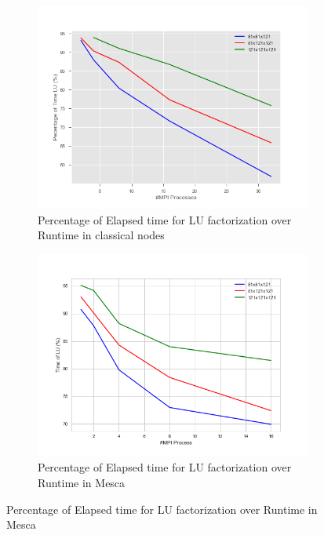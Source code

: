 \begin{figure}[!h]
\centering 
  \begin{subfigure}[b]{0.7\textwidth}
    \includegraphics[width=\textwidth]{images/Percentage_of_TimeLUCN.png}
     \caption{Percentage of Elapsed time for LU factorization over Runtime in classical nodes}
    \label{Percentage_of_TimeLU}
  \end{subfigure}
  \begin{subfigure}[b]{0.7\textwidth}
    \includegraphics[width=\textwidth]{images/Percentage_of_TimeLU_Mesca.png}
    \caption{Percentage of Elapsed time for LU factorization over Runtime in Mesca}
    \label{MemoryMPIlog}
  \end{subfigure}
  

\end{figure}
